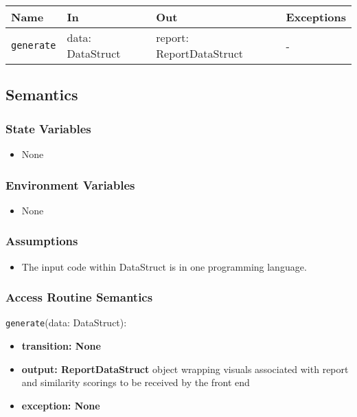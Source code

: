 \documentclass[12pt, titlepage]{article}
\begin{document}
\begin{center}
\begin{tabular}{p{5cm} p{3.5cm} p{3.5cm} p{2cm}}
\hline
\textbf{Name} & \textbf{In} & \textbf{Out} & \textbf{Exceptions} \\
\hline
\texttt{generate} & data: DataStruct & report: ReportDataStruct & -\\
\hline
\end{tabular}
\end{center}

\subsection{Semantics}

\subsubsection{State Variables}

\begin{itemize}
    \item None
\end{itemize}

\subsubsection{Environment Variables}

\begin{itemize}
  \item None
\end{itemize}

\subsubsection{Assumptions}

\begin{itemize}
    \item The input code within DataStruct is in one programming language.
\end{itemize}

\subsubsection{Access Routine Semantics}
\noindent \texttt{generate}(data: DataStruct):
\begin{itemize}
    \item \textbf{transition: None} 
    \item \textbf{output: ReportDataStruct} object wrapping visuals associated with report and 
    similarity scorings to be received by the front end
    \item \textbf{exception: None}
\end{itemize}
\end{document}
